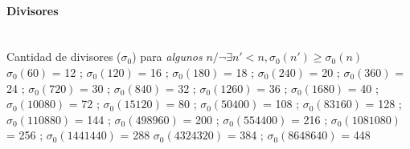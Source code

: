 \paragraph{Divisores} \ \\
Cantidad de divisores ($\sigma_0$) para \emph{algunos} $n / \neg\exists n'<n, \sigma_0(n') \geqslant \sigma_0(n)$ \\
$\sigma_0(60)$ = 12 ; $\sigma_0(120)$ = 16 ; $\sigma_0(180)$ = 18 ; $\sigma_0(240)$ = 20 ; $\sigma_0(360)$ = 24 ; $\sigma_0(720)$ = 30 ; $\sigma_0(840)$ = 32 ; $\sigma_0(1260)$ = 36 ; $\sigma_0(1680)$ = 40 ; $\sigma_0(10080)$ = 72 ; $\sigma_0(15120)$ = 80 ; $\sigma_0(50400)$ = 108 ; $\sigma_0(83160)$ = 128 ; $\sigma_0(110880)$ = 144 ;
$\sigma_0(498960)$ = 200 ; $\sigma_0(554400)$ = 216 ; $\sigma_0(1081080)$ = 256 ; $\sigma_0(1441440)$ = 288  $\sigma_0(4324320)$ = 384 ; $\sigma_0(8648640)$ = 448
 
%
%
%


